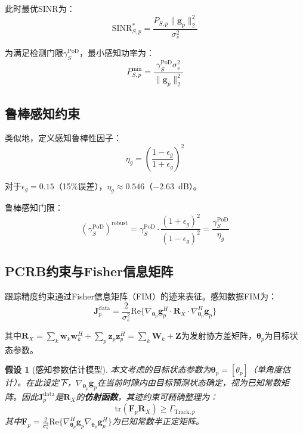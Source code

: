 \documentclass[12pt,a4paper]{article}
\newtheorem{assumption}{假设}
\newcommand{\vect}[1]{\mathbf{#1}}
\newcommand{\mat}[1]{\mathbf{#1}}
\newcommand{\norm}[1]{\|#1\|_2}
\newcommand{\tr}{\text{tr}}
\newcommand{\Real}{\text{Re}}
\begin{document}
此时最优SINR为：
\begin{equation}
\text{SINR}_{S,p}^* = \frac{P_{S,p} \norm{\vect{g}_p}^2}{\sigma_s^2} \tag{7}
\end{equation}

为满足检测门限$\gamma_S^{\text{PoD}}$，最小感知功率为：
\begin{equation}
P_{S,p}^{\min} = \frac{\gamma_S^{\text{PoD}} \sigma_s^2}{\norm{\vect{g}_p}^2} \tag{8}
\end{equation}

\subsection{鲁棒感知约束}

类似地，定义感知鲁棒性因子：
\begin{equation}
\eta_g = \left(\frac{1-\epsilon_g}{1+\epsilon_g}\right)^2 \tag{9}
\end{equation}

对于$\epsilon_g = 0.15$（15\%误差），$\eta_g \approx 0.546$（$-2.63$~dB）。

鲁棒感知门限：
\begin{equation}
(\gamma_S^{\text{PoD}})^{\text{robust}} = \gamma_S^{\text{PoD}} \cdot \frac{(1+\epsilon_g)^2}{(1-\epsilon_g)^2} = \frac{\gamma_S^{\text{PoD}}}{\eta_g} \tag{10}
\end{equation}

\subsection{PCRB约束与Fisher信息矩阵}

跟踪精度约束通过Fisher信息矩阵（FIM）的迹来表征。感知数据FIM为：
\begin{equation}
\mat{J}_p^{\text{data}} = \frac{2}{\sigma_s^2} \Real\Big\{ \nabla_{\boldsymbol{\theta}_p} \vect{g}_p^H \cdot \mat{R}_X \cdot \nabla_{\boldsymbol{\theta}_p}^H \vect{g}_p \Big\} \tag{11}
\end{equation}

其中$\mat{R}_X = \sum_k \vect{w}_k \vect{w}_k^H + \sum_p \vect{z}_p \vect{z}_p^H = \sum_k \mat{W}_k + \mat{Z}$为发射协方差矩阵，$\boldsymbol{\theta}_p$为目标状态参数。

\begin{assumption}[感知参数估计模型]\label{ass:1}
本文考虑的目标状态参数为$\boldsymbol{\theta}_p = [\theta_p]$（单角度估计）。在此设定下，$\nabla_{\boldsymbol{\theta}_p} \vect{g}_p$在当前时隙内由目标预测状态确定，视为已知常数矩阵。因此$\mat{J}_p^{\text{data}}$是$\mat{R}_X$的\textbf{仿射函数}，其迹约束可精确整理为：
\begin{equation}
\tr(\mat{F}_p \mat{R}_X) \geq \Gamma_{\text{Track},p}
\end{equation}
其中$\mat{F}_p = \frac{2}{\sigma_s^2} \Real\Big\{ \nabla_{\boldsymbol{\theta}_p}^H \vect{g}_p \nabla_{\boldsymbol{\theta}_p} \vect{g}_p^H \Big\}$为已知常数半正定矩阵。
\end{assumption}
\end{document}
